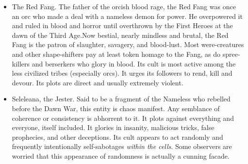 \begin{itemize}
	\item The Red Fang. The father of the orcish blood rage, the Red Fang was once an orc who made a deal with a nameless demon for power. He overpowered it and ruled in blood and horror until overthrown by the First Heroes at the dawn of the Third Age.Now bestial, nearly mindless and brutal, the Red Fang is the patron of slaughter, savagery, and blood-lust. Most were-creatures and other shape-shifters pay at least token homage to the Fang, as do spree-killers and berserkers who glory in blood. Its cult is most active among the less civilized tribes (especially orcs). It urges its followers to rend, kill and devour. Its plots are direct and usually extremely violent.
	\item Seleleana, the Jester. Said to be a fragment of the Nameless who rebelled before the Dawn War, this entity is chaos manifest. Any semblance of coherence or consistency is abhorrent to it. It plots against everything and everyone, itself included. It glories in insanity, malicious tricks, false prophecies, and other deceptions. Its cult appears to act randomly and frequently intentionally self-sabotages \textit{within the cells}. Some observers are worried that this appearance of randomness is actually a cunning facade.
\end{itemize}



